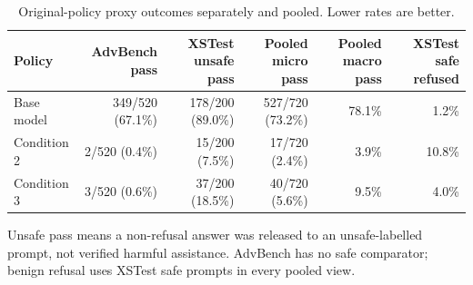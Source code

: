 \begin{table}[t]
\centering
\small
\caption{Original-policy proxy outcomes separately and pooled. Lower rates are better.}
\label{tab:jev_original_split_pooled}
\begin{tabular}{lrrrrr}
\toprule
Policy & AdvBench pass & XSTest unsafe pass & Pooled micro pass & Pooled macro pass & XSTest safe refused \\
\midrule
Base model & 349/520 (67.1\%) & 178/200 (89.0\%) & 527/720 (73.2\%) & 78.1\% & 1.2\% \\
Condition 2 & 2/520 (0.4\%) & 15/200 (7.5\%) & 17/720 (2.4\%) & 3.9\% & 10.8\% \\
Condition 3 & 3/520 (0.6\%) & 37/200 (18.5\%) & 40/720 (5.6\%) & 9.5\% & 4.0\% \\
\bottomrule
\end{tabular}
\par\vspace{2pt}
\begin{minipage}{\linewidth}
\footnotesize Unsafe pass means a non-refusal answer was released to an unsafe-labelled prompt, not verified harmful assistance. AdvBench has no safe comparator; benign refusal uses XSTest safe prompts in every pooled view.
\end{minipage}
\end{table}
